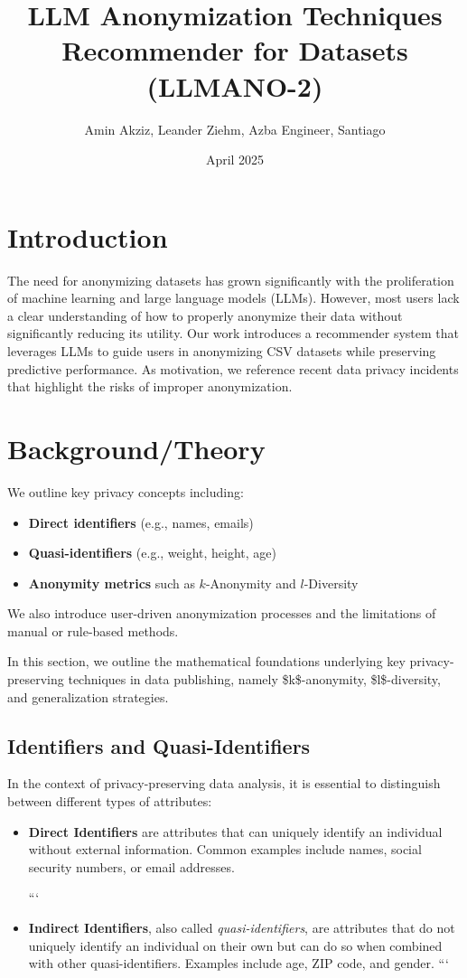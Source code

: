 \documentclass{article}
\title{LLM Anonymization Techniques Recommender for Datasets (LLMANO-2)}
\author{Amin Akziz, Leander Ziehm, Azba Engineer, Santiago}
\date{April 2025}
\begin{document}
\maketitle

\section{Introduction}
The need for anonymizing datasets has grown significantly with the proliferation of machine learning and large language models (LLMs). However, most users lack a clear understanding of how to properly anonymize their data without significantly reducing its utility. Our work introduces a recommender system that leverages LLMs to guide users in anonymizing CSV datasets while preserving predictive performance. As motivation, we reference recent data privacy incidents that highlight the risks of improper anonymization.

\section{Background/Theory}
We outline key privacy concepts including:
\begin{itemize}
    \item \textbf{Direct identifiers} (e.g., names, emails)
    \item \textbf{Quasi-identifiers} (e.g., weight, height, age)
    \item \textbf{Anonymity metrics} such as $k$-Anonymity and $l$-Diversity
\end{itemize}
We also introduce user-driven anonymization processes and the limitations of manual or rule-based methods.

In this section, we outline the mathematical foundations underlying key privacy-preserving techniques in data publishing, namely \$k\$-anonymity, \$l\$-diversity, and generalization strategies.

\subsection{Identifiers and Quasi-Identifiers}

In the context of privacy-preserving data analysis, it is essential to distinguish between different types of attributes:

\begin{itemize}
\item \textbf{Direct Identifiers} are attributes that can uniquely identify an individual without external information. Common examples include names, social security numbers, or email addresses.

```
\item \textbf{Indirect Identifiers}, also called \textit{quasi-identifiers}, are attributes that do not uniquely identify an individual on their own but can do so when combined with other quasi-identifiers. Examples include age, ZIP code, and gender.
```

\end{itemize}
\end{document}
